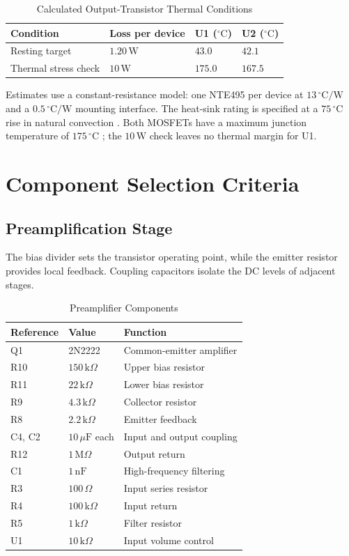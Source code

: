 \documentclass[conference,letterpaper]{IEEEtran}
\newcommand{\Ohm}{\Omega}
\newcommand{\kohm}{\mathrm{k}\Omega}
\newcommand{\uF}{\mu\mathrm{F}}
\newcommand{\nF}{\mathrm{nF}}
\newcommand{\W}{\mathrm{W}}
\begin{document}
\begin{table}[H]
\caption{Calculated Output-Transistor Thermal Conditions}
\label{tab:thermal_conditions}
\centering\footnotesize
\setlength{\tabcolsep}{2pt}
\begin{tabular}{@{}p{}p{}p{}p{}@{}}
\toprule
Condition & Loss per device & U1 (${}^\circ\mathrm{C}$) & U2 (${}^\circ\mathrm{C}$)\\
\midrule
Resting target & $1.20\,\W$ & $43.0$ & $42.1$\\
Thermal stress check & $10\,\W$ & $175.0$ & $167.5$\\
\bottomrule
\end{tabular}
\par\smallskip
\parbox{.97\columnwidth}{\scriptsize Estimates use a constant-resistance model: one NTE495 per device at $13\,{}^\circ\mathrm{C/W}$ and a $0.5\,{}^\circ\mathrm{C/W}$ mounting interface. The heat-sink rating is specified at a $75\,{}^\circ\mathrm{C}$ rise in natural convection \cite{nte495}. Both MOSFETs have a maximum junction temperature of $175\,{}^\circ\mathrm{C}$ \cite{irfz44n,irf4905}; the $10\,\W$ check leaves no thermal margin for U1.}
\end{table}
\FloatBarrier

\section{Component Selection Criteria}
\subsection{Preamplification Stage}
The bias divider sets the transistor operating point, while the
emitter resistor provides local feedback. Coupling capacitors isolate
the DC levels of adjacent stages.
\begin{table}[H]
\caption{Preamplifier Components}
\label{tab:preamp_components}
\centering\footnotesize
\setlength{\tabcolsep}{2pt}
\begin{tabular}{@{}p{}p{}p{}@{}}
\toprule
Reference & Value & Function\\
\midrule
Q1 & 2N2222 & Common-emitter amplifier\\
R10 & $150\,\kohm$ & Upper bias resistor\\
R11 & $22\,\kohm$ & Lower bias resistor\\
R9 & $4.3\,\kohm$ & Collector resistor\\
R8 & $2.2\,\kohm$ & Emitter feedback\\
C4, C2 & $10\,\uF$ each & Input and output coupling\\
R12 & $1\,\mathrm{M}\Ohm$ & Output return\\
C1 & $1\,\nF$ & High-frequency filtering\\
R3 & $100\,\Ohm$ & Input series resistor\\
R4 & $100\,\kohm$ & Input return\\
R5 & $1\,\kohm$ & Filter resistor\\
U1 & $10\,\kohm$ & Input volume control\\
\bottomrule
\end{tabular}
\end{table}
\FloatBarrier
\end{document}
